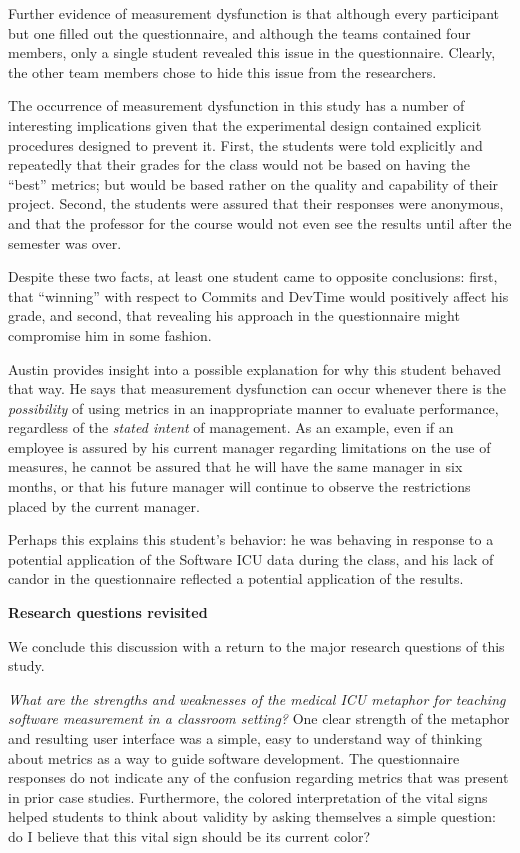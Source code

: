 \documentclass{acm_proc_article-sp}
\begin{document}
Further evidence of measurement dysfunction is that although every
participant but one filled out the questionnaire, and although the teams
contained four members, only a single student revealed this issue in the
questionnaire. Clearly, the other team members chose to hide this issue
from the researchers.

The occurrence of measurement dysfunction in this study has a number of
interesting implications given that the experimental design contained
explicit procedures designed to prevent it.  First, the students were told
explicitly and repeatedly that their grades for the class would not be
based on having the ``best'' metrics; but would be based rather on the
quality and capability of their project.  Second, the students were assured
that their responses were anonymous, and that the professor for the course
would not even see the results until after the semester was over.

Despite these two facts, at least one student came to opposite conclusions:
first, that ``winning'' with respect to Commits and DevTime would
positively affect his grade, and second, that revealing his approach in the
questionnaire might compromise him in some fashion.

Austin provides insight into a possible explanation for why this student
behaved that way.  He says that measurement dysfunction can occur whenever
there is the {\em possibility} of using metrics in an inappropriate manner
to evaluate performance, regardless of the {\em stated intent} of
management.  As an example, even if an employee is assured by his current
manager regarding limitations on the use of measures, he cannot be assured
that he will have the same manager in six months, or that his future
manager will continue to observe the restrictions placed by the current
manager.

Perhaps this explains this student's behavior: he was behaving in response
to a potential application of the Software ICU data during the class, and
his lack of candor in the questionnaire reflected a potential application
of the results.

{\bf Research questions revisited}

We conclude this discussion with a return to the major research questions of this study. 

{\em What are the strengths and weaknesses of the medical ICU metaphor
for teaching software measurement in a classroom setting?}  One clear
strength of the metaphor and resulting user interface was a simple, easy to
understand way of thinking about metrics as a way to guide software
development.  The questionnaire responses do not indicate any of the
confusion regarding metrics that was present in prior case studies.
Furthermore, the colored interpretation of the vital signs helped students
to think about validity by asking themselves a simple question: do I believe
that this vital sign should be its current color?
\end{document}
